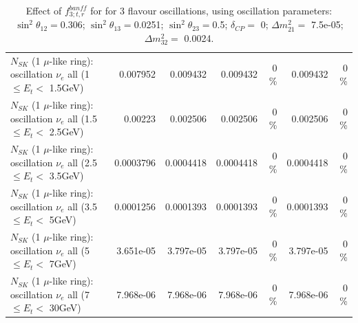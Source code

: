 \begin{table}
\begin{tabular}{| l | r | r | r  r | r  r |}
$N_{SK}$ (1 $\mu$-like ring): oscillation $\nu_{e}$ all (1 $\leq E_{t} <$ 1.5GeV) &        0.007952 &        0.009432 &        0.009432 &        0 \%  &        0.009432 &        0 \%  \\ 
$N_{SK}$ (1 $\mu$-like ring): oscillation $\nu_{e}$ all (1.5 $\leq E_{t} <$ 2.5GeV) &         0.00223 &        0.002506 &        0.002506 &        0 \%  &        0.002506 &        0 \%  \\ 
$N_{SK}$ (1 $\mu$-like ring): oscillation $\nu_{e}$ all (2.5 $\leq E_{t} <$ 3.5GeV) &       0.0003796 &       0.0004418 &       0.0004418 &        0 \%  &       0.0004418 &        0 \%  \\ 
$N_{SK}$ (1 $\mu$-like ring): oscillation $\nu_{e}$ all (3.5 $\leq E_{t} <$ 5GeV) &       0.0001256 &       0.0001393 &       0.0001393 &        0 \%  &       0.0001393 &        0 \%  \\ 
 $N_{SK}$ (1 $\mu$-like ring): oscillation $\nu_{e}$ all (5 $\leq E_{t} <$ 7GeV) &       3.651e-05 &       3.797e-05 &       3.797e-05 &        0 \%  &       3.797e-05 &        0 \%  \\ 
$N_{SK}$ (1 $\mu$-like ring): oscillation $\nu_{e}$ all (7 $\leq E_{t} <$ 30GeV) &       7.968e-06 &       7.968e-06 &       7.968e-06 &        0 \%  &       7.968e-06 &        0 \%  \\ 
\hline
\hline
\end{tabular}
\caption{ Effect of $f_{3; t, r}^{banff}$ for for 3 flavour oscillations, using oscillation parameters:  $\sin^2\theta_{12} = $0.306; $\sin^2\theta_{13} = $0.0251; $\sin^2\theta_{23} = $0.5; $\delta_{CP} = $        0; $\Delta m^2_{21} = $    7.5e-05; $\Delta m^2_{32} = $    0.0024. }
\label{tab:num_banff_03_1RmuT_3f_osc_t13:0.0251}
\end{table}
\clearpage
